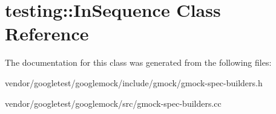 \hypertarget{classtesting_1_1_in_sequence}{}\section{testing\+:\+:In\+Sequence Class Reference}
\label{classtesting_1_1_in_sequence}


The documentation for this class was generated from the following files\+:\begin{DoxyCompactItemize}
\item 
vendor/googletest/googlemock/include/gmock/gmock-\/spec-\/builders.\+h\item 
vendor/googletest/googlemock/src/gmock-\/spec-\/builders.\+cc\end{DoxyCompactItemize}
